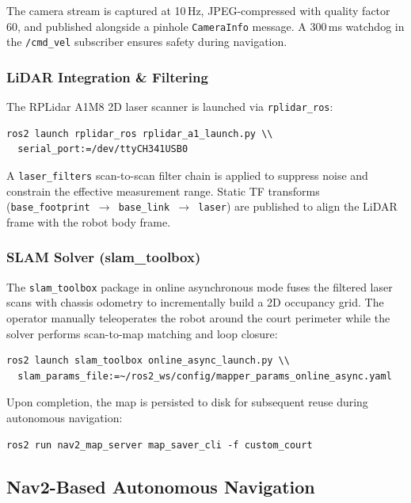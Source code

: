 The camera stream is captured at 10\,Hz, JPEG-compressed with quality factor 60, and published alongside a pinhole \texttt{CameraInfo} message. A 300\,ms watchdog in the \texttt{/cmd\_vel} subscriber ensures safety during navigation.

\subsubsection{LiDAR Integration \& Filtering}

The RPLidar A1M8 2D laser scanner is launched via \texttt{rplidar\_ros}:

\begin{verbatim}
ros2 launch rplidar_ros rplidar_a1_launch.py \\
  serial_port:=/dev/ttyCH341USB0
\end{verbatim}

A \texttt{laser\_filters} scan-to-scan filter chain is applied to suppress noise and constrain the effective measurement range. Static TF transforms (\texttt{base\_footprint $\to$ base\_link $\to$ laser}) are published to align the LiDAR frame with the robot body frame.

\subsubsection{SLAM Solver (slam\_toolbox)}

The \texttt{slam\_toolbox} package in online asynchronous mode fuses the filtered laser scans with chassis odometry to incrementally build a 2D occupancy grid. The operator manually teleoperates the robot around the court perimeter while the solver performs scan-to-map matching and loop closure:

\begin{verbatim}
ros2 launch slam_toolbox online_async_launch.py \\
  slam_params_file:=~/ros2_ws/config/mapper_params_online_async.yaml
\end{verbatim}

Upon completion, the map is persisted to disk for subsequent reuse during autonomous navigation:

\begin{verbatim}
ros2 run nav2_map_server map_saver_cli -f custom_court
\end{verbatim}


\subsection{Nav2-Based Autonomous Navigation}
\label{sec:nav2}

